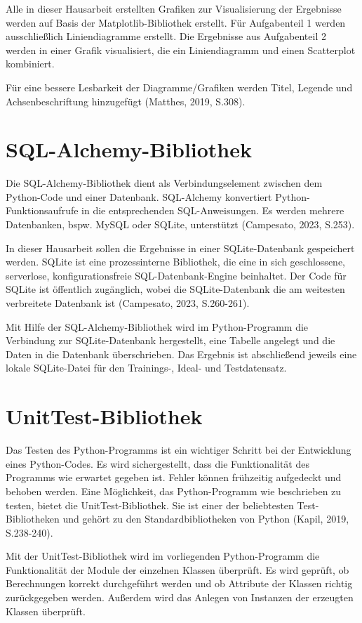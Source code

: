\documentclass[
    a4paper, 								%
    oneside, 								%
    11pt, 									%
    listof=totoc, 					%
    bibliography=totoc, 		%
    final, 									%
    numbers=noenddot
]{scrreprt}
\begin{document}
Alle in dieser Hausarbeit erstellten Grafiken zur Visualisierung der Ergebnisse werden auf Basis der Matplotlib-Bibliothek erstellt. Für Aufgabenteil 1 werden ausschließlich Liniendiagramme erstellt. Die Ergebnisse aus Aufgabenteil 2 werden in einer Grafik visualisiert, die ein Liniendiagramm und einen Scatterplot kombiniert. 

Für eine bessere Lesbarkeit der Diagramme/Grafiken werden Titel, Legende und Achsenbeschriftung hinzugefügt (Matthes, 2019, S.308).

\section{SQL-Alchemy-Bibliothek}
\label{sec:SQL}
Die SQL-Alchemy-Bibliothek dient als Verbindungselement zwischen dem Python-Code und einer Datenbank. SQL-Alchemy konvertiert Python-Funktionsaufrufe in die entsprechenden SQL-Anweisungen. Es werden mehrere Datenbanken, bspw. MySQL oder SQLite, unterstützt (Campesato, 2023, S.253).

In dieser Hausarbeit sollen die Ergebnisse in einer SQLite-Datenbank gespeichert werden. SQLite ist eine prozessinterne Bibliothek, die eine in sich geschlossene, serverlose, konfigurationsfreie SQL-Datenbank-Engine beinhaltet. Der Code für SQLite ist öffentlich zugänglich, wobei die SQLite-Datenbank die am weitesten verbreitete Datenbank ist (Campesato, 2023, S.260-261).

Mit Hilfe der SQL-Alchemy-Bibliothek wird im Python-Programm die Verbindung zur SQLite-Datenbank hergestellt, eine Tabelle angelegt und die Daten in die Datenbank überschrieben. Das Ergebnis ist abschließend jeweils eine lokale SQLite-Datei für den Trainings-, Ideal- und Testdatensatz.

\section{UnitTest-Bibliothek}
\label{sec:UnitTest}
Das Testen des Python-Programms ist ein wichtiger Schritt bei der Entwicklung eines Python-Codes. Es wird sichergestellt, dass die Funktionalität des Programms wie erwartet gegeben ist. Fehler können frühzeitig aufgedeckt und behoben werden. Eine Möglichkeit, das Python-Programm wie beschrieben zu testen, bietet die UnitTest-Bibliothek. Sie ist einer der beliebtesten Test-Bibliotheken und gehört zu den Standardbibliotheken von Python (Kapil, 2019, S.238-240). 

Mit der UnitTest-Bibliothek wird im vorliegenden Python-Programm die Funktionalität der Module der einzelnen Klassen überprüft. Es wird geprüft, ob Berechnungen korrekt durchgeführt werden und ob Attribute der Klassen richtig zurückgegeben werden. Außerdem wird das Anlegen von Instanzen der erzeugten Klassen überprüft.  
\end{document}
